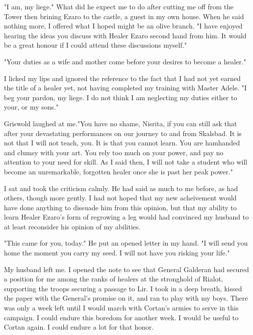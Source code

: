 \documentclass{article}
\begin{document}
"I am, my liege." What did he expect me to do after cutting me off from the Tower then brining Ezaro to the castle, a guest in my own house. When he said nothing more, I offered what I hoped might be an olive branch. "I have enjoyed hearing the ideas you discuss with Healer Ezaro second hand from him. It would be a great honour if I could attend these discussions myself."

"Your duties as a wife and mother come before your desires to become a healer." 

I licked my lips and ignored the reference to the fact that I had not yet earned the title of a healer yet, not having completed my training with Master Adele.  "I beg your pardon, my liege. I do not think I am neglecting my duties either to your, or my sons." 

Griswold laughed at me."You have no shame, Nisrita, if you can still ask that after your devastating performances on our journey to and from Skalsbad. It is not that I will not teach, you. It is that you cannot learn. You are hamhanded and clumsy with your art. You rely too much on your power, and pay no attention to your need for skill. As I said then, I will not take a student who will become an unremarkable, forgotten healer once she is past her peak power."

I sat and took the criticism calmly. He had said as much to me before, as had others, though more gently. I had not hoped that my new acheivement would have done anything to dissuade him from this opinion, but that my ability to learn Healer Ezaro's form of regrowing a leg would had convinced my husband to at least reconsider his opinion of my abilities. 

"This came for you, today." He put an opened letter in my hand. "I will send you home the moment you carry my seed. I will not have you risking your life."

My husband left me. I opened the note to see that General Galderan had secured a position for me among the ranks of healers at the stronghold of Rialot, supporting the troops securing a passage to Lir. I took in a deep breath, kissed the paper with the General's promise on it, and ran to play with my boys. There was only a week left until I would march with Cortan's armies to serve in this campaign. I could endure this boredom for another week. I would be useful to Cortan again. I could endure a lot for that honor.

\vspace{.5cm}
\end{document}
